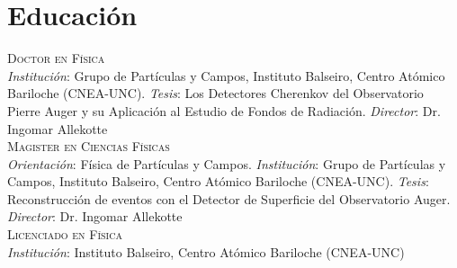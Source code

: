 \section*{Educación}
\noindent
{}\textsc{Doctor en Física}\\
{\emph{Institución}}: Grupo de Partículas y Campos, Instituto Balseiro, Centro Atómico Bariloche (CNEA-UNC). {\emph{Tesis}}: Los Detectores Cherenkov del Observatorio Pierre Auger y su Aplicación al Estudio de Fondos de Radiación. {\emph{Director}}: Dr. Ingomar Allekotte\\
\textsc{Magister en Ciencias Físicas}\\
{\emph{Orientación}}: Física de Partículas y Campos. {\emph{Institución}}: Grupo de Partículas y Campos, Instituto Balseiro, Centro Atómico Bariloche (CNEA-UNC). {\emph{Tesis}}: Reconstrucción de eventos con el Detector de Superficie del Observatorio Auger. {\emph{Director}}: Dr. Ingomar Allekotte\\
\textsc{Licenciado en Física}\\
{\emph{Institución}}: Instituto Balseiro, Centro Atómico Bariloche (CNEA-UNC)\\
\fi